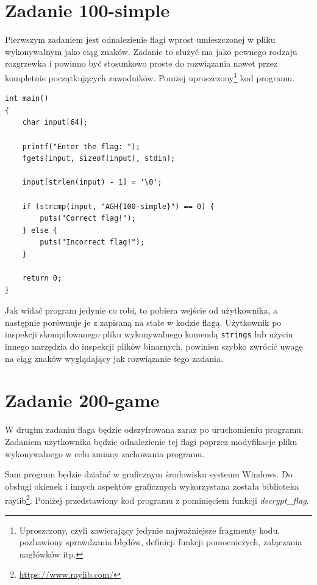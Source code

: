 \documentclass[language=polish,type=eng]{aghmodern}
\begin{document}
\section{Zadanie 100-simple}

Pierwszym zadaniem jest odnalezienie flagi wprost umieszczonej
w pliku wykonywalnym jako ciąg znaków.
Zadanie to służyć ma jako pewnego rodzaju rozgrzewka i powinno być stosunkowo
proste do rozwiązania nawet przez kompletnie początkujących zawodników.
Poniżej uproszczony\footnote{Uproszczony, czyli zawierający jedynie
najważniejsze fragmenty kodu, pozbawiony sprawdzania błędów, definicji funkcji
pomocniczych, załączania nagłówków itp.} kod programu.

\begin{verbatim}
int main()
{
    char input[64];

    printf("Enter the flag: ");
    fgets(input, sizeof(input), stdin);

    input[strlen(input) - 1] = '\0';

    if (strcmp(input, "AGH{100-simple}") == 0) {
        puts("Correct flag!");
    } else {
        puts("Incorrect flag!");
    }

    return 0;
}
\end{verbatim}

Jak widać program jedynie co robi, to pobiera wejście od użytkownika, a następnie
porównuje je z zapisaną na stałe w kodzie flagą. Użytkownik po inspekcji skompilowanego
pliku wykonywalnego komendą \texttt{strings} lub użyciu innego narzędzia
do inspekcji plików binarnych, powinien szybko zwrócić uwagę na
ciąg znaków wyglądający jak rozwiązanie tego zadania.

\section{Zadanie 200-game}

W drugim zadaniu flaga będzie odszyfrowana zaraz po uruchomieniu programu. Zadaniem
użytkownika będzie odnalezienie tej flagi poprzez modyfikacje
pliku wykonywalnego w celu zmiany zachowania programu.

Sam program będzie działać w graficznym środowisku systemu Windows.
Do obsługi okienek i innych aspektów graficznych wykorzystana została
biblioteka raylib\footnote{\url{https://www.raylib.com/}}.
Poniżej przedstawiony kod programu z pominięciem funkcji \emph{decrypt\_flag}.
\end{document}
